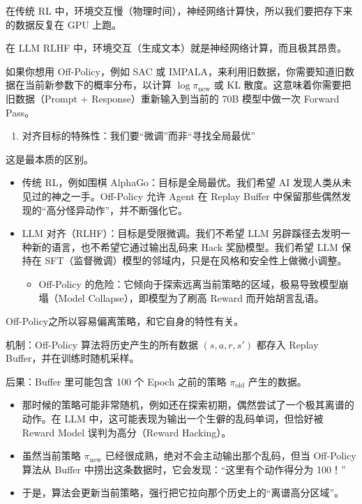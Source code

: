 在传统 RL 中，环境交互慢（物理时间），神经网络计算快，所以我们要把存下来的数据反复在 GPU 上跑。

在 LLM RLHF 中，环境交互（生成文本）就是神经网络计算，而且极其昂贵。

如果你想用 Off-Policy，例如 SAC 或 IMPALA，来利用旧数据，你需要知道旧数据在当前新参数下的概率分布，以计算 \(\log\pi_{\mathrm{new}}\) 或 KL 散度。这意味着你需要把旧数据（Prompt + Response）重新输入到当前的 70B 模型中做一次 Forward Pass。

\begin{enumerate}
\def\labelenumi{\arabic{enumi}.}
\setcounter{enumi}{2}
\tightlist
\item
  对齐目标的特殊性：我们要``微调''而非``寻找全局最优''
\end{enumerate}

这是最本质的区别。

\begin{itemize}
\tightlist
\item
  传统 RL，例如围棋 AlphaGo：目标是全局最优。我们希望 AI 发现人类从未见过的神之一手。Off-Policy 允许 Agent 在 Replay Buffer 中保留那些偶然发现的``高分怪异动作''，并不断强化它。
\item
  LLM 对齐（RLHF）：目标是受限微调。我们不希望 LLM 另辟蹊径去发明一种新的语言，也不希望它通过输出乱码来 Hack 奖励模型。我们希望 LLM 保持在 SFT（监督微调）模型的邻域内，只是在风格和安全性上做微小调整。

  \begin{itemize}
  \tightlist
  \item
    Off-Policy 的危险：它倾向于探索远离当前策略的区域，极易导致模型崩塌（Model Collapse），即模型为了刷高 Reward 而开始胡言乱语。
  \end{itemize}
\end{itemize}

Off-Policy之所以容易偏离策略，和它自身的特性有关。

机制：Off-Policy 算法将历史产生的所有数据 \((s,a,r,s')\) 都存入 Replay Buffer，并在训练时随机采样。

后果：Buffer 里可能包含 100 个 Epoch 之前的策略 \(\pi_{\mathrm{old}}\) 产生的数据。

\begin{itemize}
\tightlist
\item
  那时候的策略可能非常随机，例如还在探索初期，偶然尝试了一个极其离谱的动作。在 LLM 中，这可能表现为输出一个生僻的乱码单词，但恰好被 Reward Model 误判为高分（Reward Hacking）。
\item
  虽然当前策略 \(\pi_{\mathrm{new}}\) 已经很成熟，绝对不会主动输出那个乱码，但当 Off-Policy 算法从 Buffer 中捞出这条数据时，它会发现：``这里有个动作得分为 100！''
\item
  于是，算法会更新当前策略，强行把它拉向那个历史上的``离谱高分区域''。
\end{itemize}

